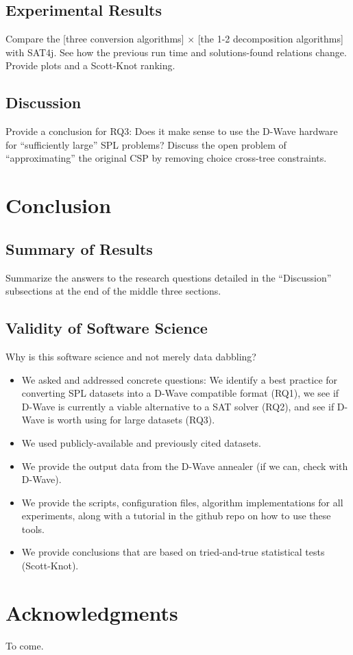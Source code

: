 \documentclass{sig-alternate-05-2015}
\begin{document}
\subsection{Experimental Results}
Compare the [three conversion algorithms] $\times$ [the 1-2 decomposition algorithms] with SAT4j. See how the previous run time and solutions-found relations change. Provide plots and a Scott-Knot ranking.

\subsection{Discussion}
Provide a conclusion for RQ3: Does it make sense to use the D-Wave hardware for ``sufficiently large'' SPL problems? Discuss the open problem of ``approximating'' the original CSP by removing choice cross-tree constraints.


\section{Conclusion}

\subsection{Summary of Results}
Summarize the answers to the research questions detailed in the ``Discussion'' subsections at the end of the middle three sections.

\subsection{Validity of Software Science}
Why is this software science and not merely data dabbling?
\begin{itemize}
\item We asked and addressed concrete questions: We identify a best practice for converting SPL datasets into a D-Wave compatible format (RQ1), we see if D-Wave is currently a viable alternative to a SAT solver (RQ2), and see if D-Wave is worth using for large datasets (RQ3).
\item We used publicly-available and previously cited datasets.
\item We provide the output data from the D-Wave annealer (if we can, check with D-Wave).
\item We provide the scripts, configuration files, algorithm implementations for all experiments, along with a tutorial in the github repo on how to use these tools.
\item We provide conclusions that are based on tried-and-true statistical tests (Scott-Knot).
\end{itemize}



\section{Acknowledgments}
To come.

%
\end{document}
